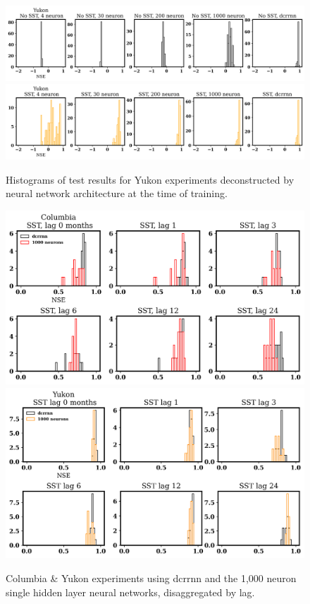 \begin{figure}[!ht]
	\centering
    \caption{Histograms of test results for Yukon experiments deconstructed by neural network architecture at the time of training.}
	\includegraphics[width=1.0\linewidth]{m3/ims/fig3_6a.png}
    \includegraphics[width=1.0\linewidth]{m3/ims/fig3_6b.png}
    \label{fig3_6}
\end{figure}

\begin{figure}[!ht]
	\centering
    \caption{Columbia \& Yukon experiments using dcrrnn and the 1,000 neuron single hidden layer neural networks, disaggregated by lag.}
	\includegraphics[width=1.0\linewidth]{m3/ims/fig3_7a.png}
    \includegraphics[width=1.0\linewidth]{m3/ims/fig3_7b.png}
    \label{fig3_7}
\end{figure}

